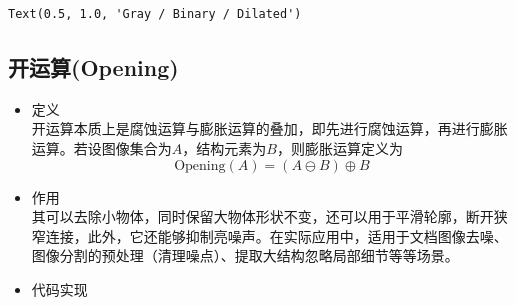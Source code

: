 \documentclass[11pt]{article}
\makeatletter
\newcommand{\boxspacing}{\kern\kvtcb@left@rule\kern\kvtcb@boxsep}
\newcommand{\prompt}[4]{
	{\ttfamily\llap{{\color{#2}[#3]:\hspace{3pt}#4}}\vspace{-\baselineskip}}
}
\makeatother
\begin{document}
            \begin{tcolorbox}[breakable, size=fbox, boxrule=.5pt, pad at break*=1mm, opacityfill=0]
\begin{Verbatim}[commandchars=\\\{\}]
Text(0.5, 1.0, 'Gray / Binary / Dilated')
\end{Verbatim}
\end{tcolorbox}
        
        
    \begin{center}
    \end{center}
    
   
   
         \subsection{开运算(Opening)}
   \begin{itemize}
   	\item 定义\\
   	开运算本质上是腐蚀运算与膨胀运算的叠加，即先进行腐蚀运算，再进行膨胀运算。若设图像集合为$A$，结构元素为$B$，则膨胀运算定义为
   	$$\text{Opening}(A)=(A\ominus B)\oplus B$$
   	\item 作用\\
   	其可以去除小物体，同时保留大物体形状不变，还可以用于平滑轮廓，断开狭窄连接，此外，它还能够抑制亮噪声。在实际应用中，适用于文档图像去噪、图像分割的预处理（清理噪点）、提取大结构忽略局部细节等等场景。
   	\item 代码实现
   	\begin{center}
   	\end{center}
   \end{itemize}
   
\end{document}
